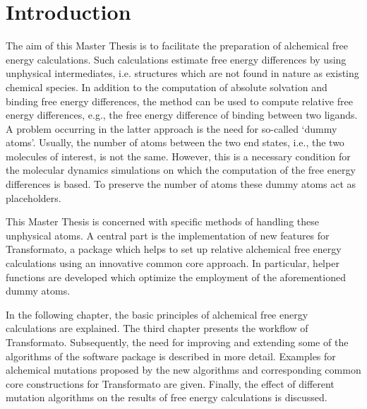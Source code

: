 \chapter{Introduction}

The aim of this Master Thesis is to facilitate the preparation of
alchemical free energy calculations. Such calculations
estimate free energy differences by using unphysical intermediates, i.e. structures
which are not found in nature as existing chemical species. In addition
to the computation of absolute solvation and binding free energy differences,
the method can be used to compute relative free energy differences, e.g.,
the free energy difference of binding between two ligands. A problem occurring
in the latter approach is the need for so-called \textquoteleft dummy
atoms\textquoteright . Usually, the number of atoms between the two
end states, i.e., the two molecules of interest, is not the same.
However, this is a necessary condition for the molecular dynamics
simulations on which the computation of the free energy differences
is based. To preserve the number of atoms these dummy atoms act as
placeholders\cite{Fleck.2021}. 

This Master Thesis is concerned with specific methods of handling these unphysical
atoms. A central part is the implementation of new features
for Transformato, a package which helps to set up relative alchemical
free energy calculations using an innovative common core approach\cite{key-2}\cite{Wieder.2022}.
In particular, helper functions are developed which optimize the employment of
the aforementioned dummy atoms.

In the following chapter, the basic principles of alchemical free energy
calculations are explained. The third chapter presents the workflow
of Transformato. Subsequently, the need for improving and extending some of the algorithms of the software
package is described in more detail. Examples for alchemical mutations
proposed by the new algorithms and corresponding common core constructions
for Transformato are given. Finally, the effect of different mutation
algorithms on the results of free energy calculations is discussed.